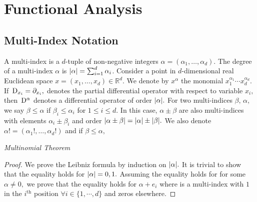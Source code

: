 \chapter{Functional Analysis}

\section{Multi-Index Notation}
A multi-index is a $d$-tuple of non-negative integers $\alpha=(\alpha_1,\dotsc,\alpha_d).$ The degree of a multi-index $\alpha$ is $\abs{\alpha}=\sum_{i=1}^d\alpha_i$. Consider a point in $d$-dimensional real Euclidean space $x=(x_1,\dotsc,x_d)\in\mathbb{R}^d.$ We denote by $x^\alpha$ the monomial $x_1^{\alpha_1}\cdots x_d^{\alpha_d}.$ If $\,\mathrm{D}_{x_i}=\partial_{x_i},$ denotes the partial differential operator with respect to variable $x_i,$ then 
$\,\mathrm{D}^\alpha$ denotes a differential operator of order $\abs{\alpha}.$
For two multi-indices $\beta,\,\alpha,$ we say $\beta\leq\alpha$ if $\beta_i\leq\alpha_i$ for $1\leq i\leq d.$ In this case, $\alpha\pm\beta$ are also multi-indices with elements $\alpha_i\pm\beta_i$ and order $\abs{\alpha\pm\beta}=\abs{\alpha}\pm\abs{\beta}.$ We also denote $\alpha!=(\alpha_1!,\dotsc,\alpha_d!)$ and if $\beta\leq\alpha,$

\begin{theorem}
    \textit{Multinomial Theorem}
\end{theorem}
\begin{theorem}
\end{theorem}
\begin{proof}
We prove the Leibniz formula by induction on $\abs{\alpha}.$ It is trivial to show that the equality holds for $\abs{\alpha}=0,1.$ Assuming the equality holds for for some $\alpha\neq0,$ we prove that the equality holds for $\alpha+e_i$ where is a multi-index with $1$ in the $i^\mathrm{th}$ position $\forall i\in\{1,\cdots,d\}$ and zeros elsewhere.

    
\end{proof}

